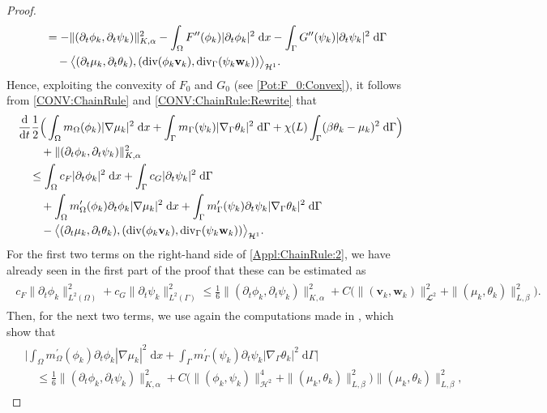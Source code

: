 \documentclass[10pt,reqno]{amsart}
\theoremstyle{remark}
\numberwithin{equation}{section}
\newcommand{\abs}[1]{| #1 |}
\newcommand{\Bigabs}[1]{\Big| #1 \Big|}
\newcommand{\norm}[1]{\| #1 \|}
\newcommand{\bigang}[2]{ \big< #1 , #2  \big>}
\newcommand{\bv}{\mathbf{v}}
\newcommand{\bw}{\mathbf{w}}
\newcommand{\intO}{\int_\Omega}
\newcommand{\intG}{\int_\Gamma}
\newcommand{\dx}{\;\mathrm{d}x}
\newcommand{\dG}{\;\mathrm d\Ga}
\newcommand{\ddt}{\frac{\mathrm d}{\mathrm dt}}
\newcommand{\delt}{\partial_{t}}
\newcommand{\Grad}{\nabla}
\newcommand{\Div}{\textnormal{div}}
\newcommand{\Gradg}{\nabla_\Ga}
\newcommand{\Divg}{\textnormal{div}_\Ga}
\newcommand{\Om}{\Omega}
\newcommand{\Ga}{\Gamma}
\begin{document}
\begin{proof}
\begin{align}
\begin{split}
        &\quad = - \norm{(\delt\phi_k,\delt\psi_k)}_{K,\alpha}^2 - \intO F^{\prime\prime}(\phi_k)\abs{\delt\phi_k}^2\dx - \intG G^{\prime\prime}(\psi_k)\abs{\delt\psi_k}^2\dG \\
        &\qquad - \bigang{(\delt\mu_k,\delt\theta_k)}{(\Div(\phi_k\mathbf{v}_k),\Divg(\psi_k\mathbf{w}_k))}_{\mathcal{H}^1}.
    \end{split}
\end{align}
Hence, exploiting the convexity of $F_0$ and $G_0$ (see \eqref{Pot:F_0:Convex}), it follows from \eqref{CONV:ChainRule} and \eqref{CONV:ChainRule:Rewrite} that
\begin{align}\label{Appl:ChainRule:2}
    &\ddt\frac12\Big(\intO m_\Om(\phi_k)\abs{\Grad\mu_k}^2\dx + \intG m_\Ga(\psi_k)\abs{\Gradg\theta_k}^2\dG + \chi(L)\intG (\beta\theta_k - \mu_k)^2\dG \Big)  \nonumber \\
    &\qquad + \norm{(\delt\phi_k,\delt\psi_k)}_{K,\alpha}^2 \nonumber \\
    &\quad \leq \intO c_F\abs{\delt\phi_k}^2\dx + \intG c_G \abs{\delt\psi_k}^2\dG \\
    &\qquad + \intO m_\Om^\prime(\phi_k)\delt\phi_k\abs{\Grad\mu_k}^2\dx + \intG m_\Ga^\prime(\psi_k)\delt\psi_k\abs{\Gradg\theta_k}^2\dG \nonumber \\
    &\qquad - \bigang{(\delt\mu_k,\delt\theta_k)}{(\Div(\phi_k\mathbf{v}_k),\Divg(\psi_k\mathbf{w}_k))}_{\mathcal{H}^1}. \nonumber
\end{align}
For the first two terms on the right-hand side of \eqref{Appl:ChainRule:2}, we have already seen in the first part of the proof that these can be estimated as
\begin{align}\label{Est:HighReg:LowOrd}
    \begin{split}
        c_F\norm{\delt\phi_k}_{L^2(\Om)}^2 + c_G\norm{\delt\psi_k}_{L^2(\Ga)}^2\leq \frac16\norm{(\delt\phi_k,\delt\psi_k)}_{K,\alpha}^2 + C\Big(\norm{(\bv_k,\bw_k)}_{\mathbfcal{L}^2}^2 + \norm{(\mu_k,\theta_k)}_{L,\beta}^2\Big).
    \end{split}
\end{align}
Then, for the next two terms, we use again the computations made in \cite[Eqns.~(6.17)--(6.18)]{Stange2025}, which show that
\begin{align}\label{Est:HighReg:Mob}
    \begin{split}
        &\Bigabs{\intO m_\Om^\prime(\phi_k)\delt\phi_k\abs{\Grad\mu_k}^2\dx + \intG m_\Ga^\prime(\psi_k)\delt\psi_k\abs{\Gradg\theta_k}^2\dG} \\
        &\quad\leq \frac16\norm{(\delt\phi_k,\delt\psi_k)}_{K,\alpha}^2 + C\Big(\norm{(\phi_k,\psi_k)}_{\mathcal{H}^2}^4 + \norm{(\mu_k,\theta_k)}_{L,\beta}^2\Big)\norm{(\mu_k,\theta_k)}_{L,\beta}^2,

\end{split}
\end{align}
\end{proof}
\end{document}
